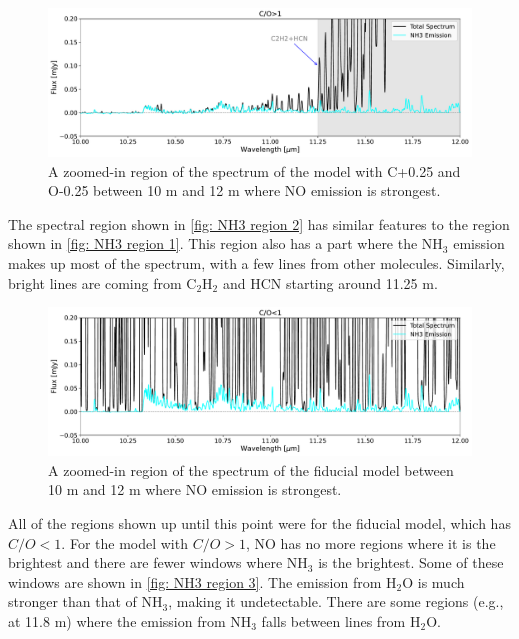 \documentclass[oneside, single, authoryear, semicolon, 12pt]{lion-msc}
\newcommand{\4}{$_4$}
\newcommand{\3}{$_3$}
\newcommand{\2}{$_2$}
\begin{document}
\begin{figure}[H]
    \centering
    \includegraphics[width=\linewidth]{Figures/NH3_region2.pdf}
    \caption{A zoomed-in region of the spectrum of the model with C+0.25 and O-0.25 between 10 \textmu m and 12 \textmu m where NO emission is strongest.}
    \label{fig: NH3 region 2}
\end{figure}

The spectral region shown in \autoref{fig: NH3 region 2} has similar features to the region shown in \autoref{fig: NH3 region 1}. This region also has a part where the NH\3 emission makes up most of the spectrum, with a few lines from other molecules. Similarly, bright lines are coming from C\2H\2 and HCN starting around 11.25 \textmu m.

\begin{figure}[H]
    \centering
    \includegraphics[width=\linewidth]{Figures/NH3_region3.pdf}
    \caption{A zoomed-in region of the spectrum of the fiducial model between 10 \textmu m and 12 \textmu m where NO emission is strongest.}
    \label{fig: NH3 region 3}
\end{figure}

All of the regions shown up until this point were for the fiducial model, which has $C/O<1$. For the model with $C/O>1$, NO has no more regions where it is the brightest and there are fewer windows where NH\3 is the brightest. Some of these windows are shown in \autoref{fig: NH3 region 3}. The emission from H\2O is much stronger than that of NH\3, making it undetectable. There are some regions (e.g., at 11.8 \textmu m) where the emission from NH\3 falls between lines from H\2O. 
\end{document}
